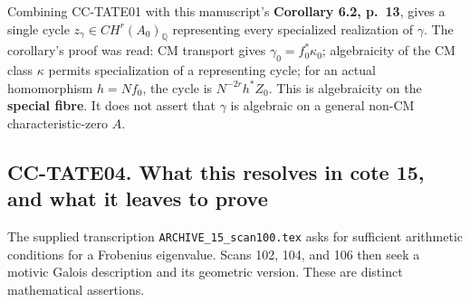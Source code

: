 \documentclass[11pt,a4paper]{article}
\theoremstyle{definition}\newtheorem{definition}[theorem]{Definition}
\theoremstyle{remark}\newtheorem{remark}[theorem]{Remark}
\begin{document}
Combining CC-TATE01 with this manuscript's \textbf{Corollary 6.2,
p.~13}, gives a single cycle \(z_\gamma\in CH^r(A_0)_{\mathbb Q}\)
representing every specialized realization of \(\gamma\). The
corollary's proof was read: CM transport gives
\(\gamma_0=f_0^*\kappa_0\); algebraicity of the CM class \(\kappa\)
permits specialization of a representing cycle; for an actual
homomorphism \(h=Nf_0\), the cycle is \(N^{-2r}h^*Z_0\). This is
algebraicity on the \textbf{special fibre}. It does not assert that
\(\gamma\) is algebraic on a general non-CM characteristic-zero \(A\).

\subsection{CC-TATE04. What this resolves in cote 15, and what it leaves
to
prove}\label{cc-tate04.-what-this-resolves-in-cote-15-and-what-it-leaves-to-prove}

The supplied transcription \nolinkurl{ARCHIVE_15_scan100.tex} asks for
sufficient arithmetic conditions for a Frobenius eigenvalue. Scans 102,
104, and 106 then seek a motivic Galois description and its geometric
version. These are distinct mathematical assertions.
\end{document}

